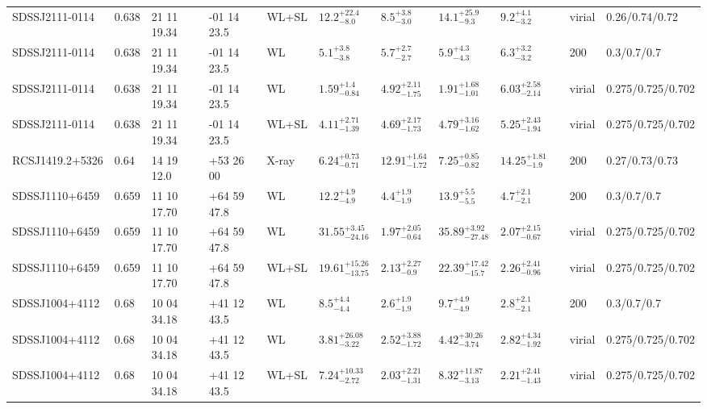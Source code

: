 \begin{landscape}
\begin{center}
{\begin{longtable}{llllllllllll}
SDSSJ2111-0114 & 0.638 & 21 11 19.34 & -01 14 23.5 & WL+SL & ${12.2}^{+22.4}_{-8.0}$ & ${8.5}^{+3.8}_{-3.0}$ & ${14.1}^{+25.9}_{-9.3}$ & ${9.2}^{+4.1}_{-3.2}$ & \citet{OG09.1} & virial & 0.26/0.74/0.72 \\
SDSSJ2111-0114 & 0.638 & 21 11 19.34 & -01 14 23.5 & WL & ${5.1}^{+3.8}_{-3.8}$ & ${5.7}^{+2.7}_{-2.7}$ & ${5.9}^{+4.3}_{-4.3}$ & ${6.3}^{+3.2}_{-3.2}$ & \citet{SE14.1} & 200 & 0.3/0.7/0.7 \\
SDSSJ2111-0114 & 0.638 & 21 11 19.34 & -01 14 23.5 & WL & ${1.59}^{+1.4}_{-0.84}$ & ${4.92}^{+2.11}_{-1.75}$ & ${1.91}^{+1.68}_{-1.01}$ & ${6.03}^{+2.58}_{-2.14}$ & \citet{OG12.1} & virial & 0.275/0.725/0.702 \\
SDSSJ2111-0114 & 0.638 & 21 11 19.34 & -01 14 23.5 & WL+SL & ${4.11}^{+2.71}_{-1.39}$ & ${4.69}^{+2.17}_{-1.73}$ & ${4.79}^{+3.16}_{-1.62}$ & ${5.25}^{+2.43}_{-1.94}$ & \citet{OG12.1} & virial & 0.275/0.725/0.702 \\
RCSJ1419.2+5326 & 0.64 & 14 19 12.0 & +53 26 00 & X-ray & ${6.24}^{+0.73}_{-0.71}$ & ${12.91}^{+1.64}_{-1.72}$ & ${7.25}^{+0.85}_{-0.82}$ & ${14.25}^{+1.81}_{-1.9}$ & \citet{BA14.1} & 200 & 0.27/0.73/0.73 \\
SDSSJ1110+6459 & 0.659 & 11 10 17.70 & +64 59 47.8 & WL & ${12.2}^{+4.9}_{-4.9}$ & ${4.4}^{+1.9}_{-1.9}$ & ${13.9}^{+5.5}_{-5.5}$ & ${4.7}^{+2.1}_{-2.1}$ & \citet{SE14.1} & 200 & 0.3/0.7/0.7 \\
SDSSJ1110+6459 & 0.659 & 11 10 17.70 & +64 59 47.8 & WL & ${31.55}^{+3.45}_{-24.16}$ & ${1.97}^{+2.05}_{-0.64}$ & ${35.89}^{+3.92}_{-27.48}$ & ${2.07}^{+2.15}_{-0.67}$ & \citet{OG12.1} & virial & 0.275/0.725/0.702 \\
SDSSJ1110+6459 & 0.659 & 11 10 17.70 & +64 59 47.8 & WL+SL & ${19.61}^{+15.26}_{-13.75}$ & ${2.13}^{+2.27}_{-0.9}$ & ${22.39}^{+17.42}_{-15.7}$ & ${2.26}^{+2.41}_{-0.96}$ & \citet{OG12.1} & virial & 0.275/0.725/0.702 \\
SDSSJ1004+4112 & 0.68 & 10 04 34.18 & +41 12 43.5 & WL & ${8.5}^{+4.4}_{-4.4}$ & ${2.6}^{+1.9}_{-1.9}$ & ${9.7}^{+4.9}_{-4.9}$ & ${2.8}^{+2.1}_{-2.1}$ & \citet{SE14.1} & 200 & 0.3/0.7/0.7 \\
SDSSJ1004+4112 & 0.68 & 10 04 34.18 & +41 12 43.5 & WL & ${3.81}^{+26.08}_{-3.22}$ & ${2.52}^{+3.88}_{-1.72}$ & ${4.42}^{+30.26}_{-3.74}$ & ${2.82}^{+4.34}_{-1.92}$ & \citet{OG12.1} & virial & 0.275/0.725/0.702 \\
SDSSJ1004+4112 & 0.68 & 10 04 34.18 & +41 12 43.5 & WL+SL & ${7.24}^{+10.33}_{-2.72}$ & ${2.03}^{+2.21}_{-1.31}$ & ${8.32}^{+11.87}_{-3.13}$ & ${2.21}^{+2.41}_{-1.43}$ & \citet{OG12.1} & virial & 0.275/0.725/0.702 \\

\end{longtable}}
\end{center}
\end{landscape}
